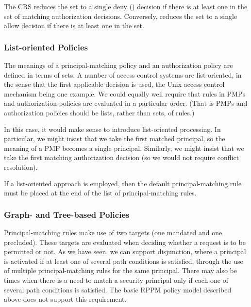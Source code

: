 \documentclass{article}
\begin{document}
The  CRS reduces the set to a single deny () decision if there is at least one  in the set of matching authorization decisions.
Conversely,  reduces the set to a single allow decision if there is at least one  in the set.

\subsubsection{List-oriented Policies}\label{sec:model:policy-extensions:list-oriented-policies}
The meanings of a principal-matching policy and an authorization policy are defined in terms of sets.
A number of access control systems are list-oriented, in the sense that the first applicable decision is used, the Unix access control mechanism being one example.
We could equally well require that rules in PMPs and authorization policies are evaluated in a particular order.
(That is PMPs and authorization policies should be lists, rather than sets, of rules.)

In this case, it would make sense to introduce list-oriented processing.
In particular, we might insist that we take the first matched principal, so the meaning of a PMP becomes a single principal.
Similarly, we might insist that we take the first matching authorization decision (so we would not require conflict resolution).

If a list-oriented approach is employed, then the default principal-matching rule  must be placed at the end of the list of principal-matching rules.

\subsubsection{Graph- and Tree-based Policies}\label{sec:model:policy-extensions:tree-based-policies}

\newcommand{\sbpmp}{\ensuremath{_{\rm PMP}}}

Principal-matching rules make use of two targets (one mandated and one precluded).
These targets are evaluated when deciding whether a request is to be permitted or not.
As we have seen, we can support disjunction, where a principal is activated if at least one of several path conditions is satisfied, through the use of multiple principal-matching rules for the same principal.
There may also be times when there is a need to match a security principal only if each one of several path conditions is satisfied.
The basic RPPM policy model described above does not support this requirement.
\end{document}
